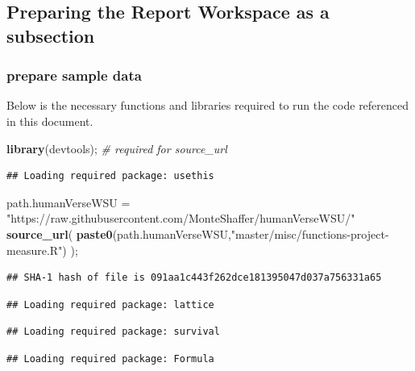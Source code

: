 \documentclass[]{article}
\newenvironment{Shaded}{\begin{snugshade}}{\end{snugshade}}
\newcommand{\CommentTok}[1]{\textcolor[rgb]{0.56,0.35,0.01}{\textit{#1}}}
\newcommand{\KeywordTok}[1]{\textcolor[rgb]{0.13,0.29,0.53}{\textbf{#1}}}
\newcommand{\NormalTok}[1]{#1}
\newcommand{\StringTok}[1]{\textcolor[rgb]{0.31,0.60,0.02}{#1}}
\begin{document}
\newpage

\subsection{Preparing the Report Workspace as a subsection}
\label{sec:appendix-setup}

\subsubsection{prepare sample data}
\label{sec:appendix-setup2}

Below is the necessary functions and libraries required to run the code
referenced in this document.

\begin{Shaded}
\begin{Highlighting}[]
\KeywordTok{library}\NormalTok{(devtools);       }\CommentTok{\# required for source\_url}
\end{Highlighting}
\end{Shaded}

\begin{verbatim}
## Loading required package: usethis
\end{verbatim}

\begin{Shaded}
\begin{Highlighting}[]
\NormalTok{path.humanVerseWSU =}\StringTok{ "https://raw.githubusercontent.com/MonteShaffer/humanVerseWSU/"}
\KeywordTok{source\_url}\NormalTok{( }\KeywordTok{paste0}\NormalTok{(path.humanVerseWSU,}\StringTok{"master/misc/functions{-}project{-}measure.R"}\NormalTok{) );}
\end{Highlighting}
\end{Shaded}

\begin{verbatim}
## SHA-1 hash of file is 091aa1c443f262dce181395047d037a756331a65
\end{verbatim}

\begin{verbatim}
## Loading required package: lattice
\end{verbatim}

\begin{verbatim}
## Loading required package: survival
\end{verbatim}

\begin{verbatim}
## Loading required package: Formula
\end{verbatim}
\end{document}
